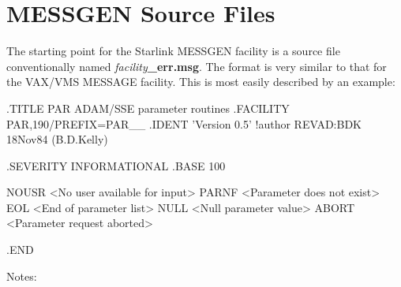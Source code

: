 \documentclass[11pt,nolof]{starlink}
\begin{document}
\section{MESSGEN Source Files}
The starting point for the Starlink MESSGEN facility is a source file
conventionally named \emph{facility}\textbf{\_err.msg}. The format is very
similar to that for the VAX/VMS MESSAGE facility. This is most easily
described by an example:
\begin{small}
\begin{terminalv}
.TITLE          PAR             ADAM/SSE parameter routines
.FACILITY       PAR,190/PREFIX=PAR__
.IDENT          'Version 0.5'
!author         REVAD:BDK 18Nov84 (B.D.Kelly)

.SEVERITY       INFORMATIONAL
.BASE 100

NOUSR           <No user available for input>
PARNF           <Parameter does not exist>
EOL             <End of parameter list>
NULL            <Null parameter value>
ABORT           <Parameter request aborted>

.END
\end{terminalv}
\end{small}
Notes:
\end{document}
